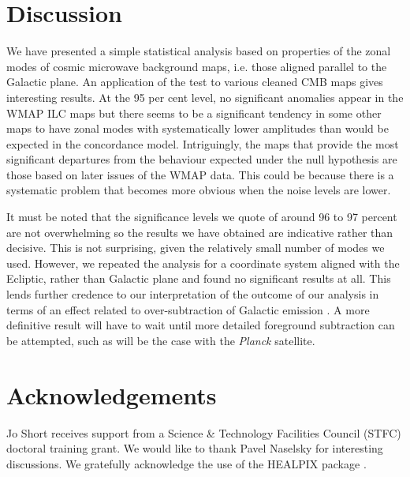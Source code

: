 \documentclass[useAMS,usenatbib,usegraphicx]{mn2e}
\begin{document}
\section{Discussion}
We have presented a simple statistical analysis based on properties
of the zonal modes of cosmic microwave background maps, i.e. those
aligned parallel to the Galactic plane. An application of the test
to various cleaned CMB maps gives interesting results. At the 95 per
cent level, no significant anomalies appear in the WMAP ILC maps
\citep{b1,b2,b3} but there seems to be a significant tendency in
some other maps \citep{b4,b5} to have zonal modes with
systematically lower amplitudes than would be expected in the
concordance model. Intriguingly, the maps that provide the most
significant departures from the behaviour expected under the null
hypothesis are those based on later issues of the WMAP data. This
could be because there is a systematic problem that becomes more
obvious when the noise levels are lower.

It must be noted that the significance levels we quote of around 96
to 97 percent are not overwhelming so the results we have obtained
are indicative rather than decisive. This is not surprising, given
the relatively small number of modes we used. However, we repeated
the analysis for a coordinate system aligned with the Ecliptic,
rather than Galactic plane and found no significant results at all.
This lends further credence to our interpretation of the outcome of
our analysis in terms of an effect related to over-subtraction of
Galactic emission \citep{cnc3,nvn}. A more definitive result will
have to wait until more detailed foreground subtraction can be
attempted, such as will be the case with the {\em Planck} satellite.



\section*{Acknowledgements}
Jo Short receives support from a Science \& Technology
Facilities Council (STFC) doctoral training grant. We would like to
thank Pavel Naselsky for interesting discussions. We gratefully
acknowledge the use of the HEALPIX package \citep{heal}.
\end{document}
